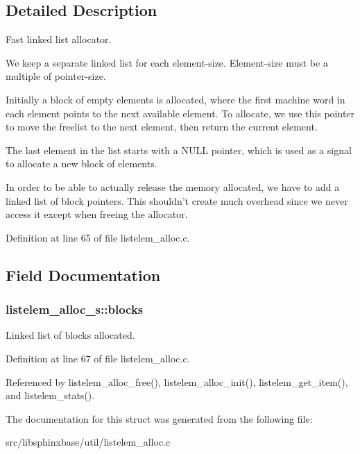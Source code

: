 \subsection{Detailed Description}
Fast linked list allocator. 

We keep a separate linked list for each element-\/size. Element-\/size must be a multiple of pointer-\/size.

Initially a block of empty elements is allocated, where the first machine word in each element points to the next available element. To allocate, we use this pointer to move the freelist to the next element, then return the current element.

The last element in the list starts with a N\-U\-L\-L pointer, which is used as a signal to allocate a new block of elements.

In order to be able to actually release the memory allocated, we have to add a linked list of block pointers. This shouldn't create much overhead since we never access it except when freeing the allocator. 

Definition at line 65 of file listelem\-\_\-alloc.\-c.



\subsection{Field Documentation}
\subsubsection[{blocks}]{ listelem\-\_\-alloc\-\_\-s\-::blocks}\label{structlistelem__alloc__s_a1216578b1d5416dc0a03c802cfa1def9}


Linked list of blocks allocated. 



Definition at line 67 of file listelem\-\_\-alloc.\-c.



Referenced by listelem\-\_\-alloc\-\_\-free(), listelem\-\_\-alloc\-\_\-init(), listelem\-\_\-get\-\_\-item(), and listelem\-\_\-stats().



The documentation for this struct was generated from the following file\-:\begin{DoxyCompactItemize}
\item 
src/libsphinxbase/util/listelem\-\_\-alloc.\-c\end{DoxyCompactItemize}
